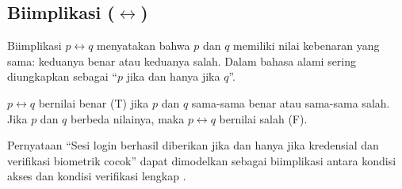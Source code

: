\subsection{Biimplikasi ($\leftrightarrow$)}

Biimplikasi $p \leftrightarrow q$ menyatakan bahwa $p$ dan $q$ memiliki nilai kebenaran yang sama: keduanya benar atau keduanya salah. Dalam bahasa alami sering diungkapkan sebagai ``$p$ jika dan hanya jika $q$''.

\begin{definisi}
$p \leftrightarrow q$ bernilai benar (T) jika $p$ dan $q$ sama-sama benar atau sama-sama salah. Jika $p$ dan $q$ berbeda nilainya, maka $p \leftrightarrow q$ bernilai salah (F).
\end{definisi}

\begin{contoh}
Pernyataan ``Sesi login berhasil diberikan jika dan hanya jika kredensial dan verifikasi biometrik cocok'' dapat dimodelkan sebagai biimplikasi antara kondisi akses dan kondisi verifikasi lengkap \cite{wiki_first_order_logic}.
\end{contoh}
